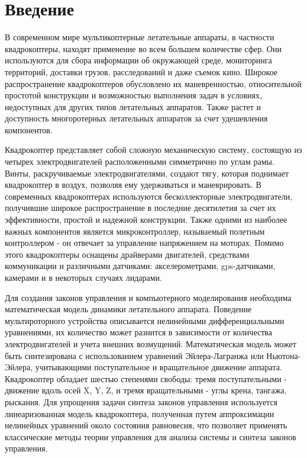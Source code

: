 \chapter*{Введение}
\label{ch:chap1}



В современном мире мультикоптерные летательные аппараты, 
в частности квадрокоптеры, находят применение во всем большем количестве 
сфер. Они используются для сбора информации об окружающей 
среде, мониторинга территорий, доставки грузов, расследований
и даже съемок кино. 
Широкое распространение квадрокоптеров обусловлено 
их маневренностью, относительной простотой конструкции и 
возможностью выполнения задач в условиях, недоступных 
для других типов летательных аппаратов. Также растет и доступность многоротерных 
летательных аппаратов за счет удешевления компонентов.

Квадрокоптер представляет собой сложную механическую систему, состоящую из 
четырех электродвигателей расположенными симметрично по углам рамы. 
Винты, раскручиваемые электродвигателями, создают тягу, которая поднимает квадрокоптер в воздух, 
позволяя ему удерживаться и маневрировать. В современных квадрокоптерах 
используются бесколлекторные электродвигатели, получившие широкое 
распространение в последние десятилетия за счет их эффективности, 
простой и надежной конструкции. Также одними из наиболее важных 
компонентов является микроконтроллер, называемый полетным контроллером - 
он отвечает за управление напряжением на моторах. Помимо этого квадрокоптеры 
оснащены драйверами двигателей, средствами коммуникации и различными датчиками: 
акселерометрами, gps-датчиками, камерами и в некоторых случаях лидарами.

Для создания законов управления и компьютерного моделирования необходима 
математическая модель динамики летательного аппарата. Поведение мультироторного 
устройства описывается нелинейными дифференциальными уравнениями, их 
количество может разнится в зависимости от количества электродвигателей 
и учета внешних возмущений. Математическая модель может быть синтезирована 
с использованием 
уравнений Эйлера-Лагранжа или Ньютона-Эйлера, учитывающими поступательное и 
вращательное движение аппарата.  Квадрокоптер обладает шестью степенями свободы:
тремя поступательными - движение вдоль осей X, Y, Z, и тремя вращательными - углы крена, тангажа, рыскания.
Для упрощения задачи синтеза законов управления  используется 
линеаризованная модель квадрокоптера, полученная путем аппроксимации 
нелинейных уравнений около состояния равновесия, что позволяет применять 
классические методы теории управления для анализа системы и синтеза законов управления.



